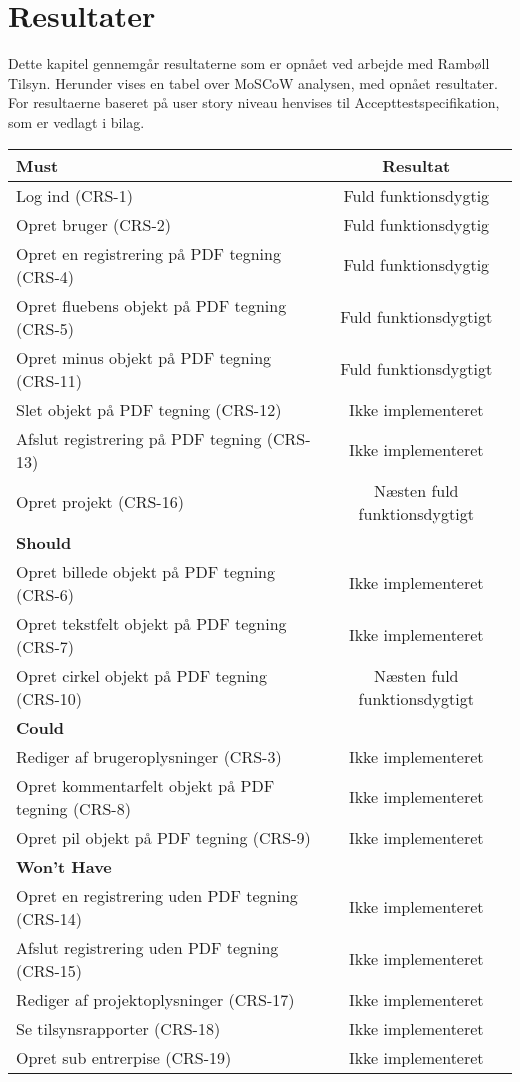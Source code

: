 \chapter{Resultater}
Dette kapitel gennemgår resultaterne som er opnået ved arbejde med Rambøll Tilsyn. Herunder vises en tabel over MoSCoW analysen, med opnået resultater.\\
For resultaerne baseret på user story niveau henvises til Accepttestspecifikation, som er vedlagt i bilag. \\
\begin{tabular}{ l | c  }
	\hline
	\textbf{Must} & \textbf{Resultat} \\ \hline
	Log ind (CRS-1) & Fuld funktionsdygtig \\
	\hline
	Opret bruger (CRS-2) & Fuld funktionsdygtig \\
	\hline
	Opret en registrering på PDF tegning (CRS-4) & Fuld funktionsdygtig\\
	\hline
	Opret fluebens objekt på PDF tegning (CRS-5) & Fuld funktionsdygtigt\\
	\hline
	Opret minus objekt på PDF tegning (CRS-11) & Fuld funktionsdygtigt\\
	\hline
	Slet objekt på PDF tegning (CRS-12) & Ikke implementeret\\
	\hline
	Afslut registrering på PDF tegning (CRS-13) & Ikke implementeret\\
	\hline
	Opret projekt (CRS-16) & Næsten fuld funktionsdygtigt\\
	\hline
	\hline
	\textbf{Should} &  \\ \hline
	Opret billede objekt på PDF tegning (CRS-6) & Ikke implementeret\\
	\hline
	Opret tekstfelt objekt på PDF tegning (CRS-7) & Ikke implementeret\\
	\hline
	Opret cirkel objekt på PDF tegning (CRS-10) & Næsten fuld funktionsdygtigt\\
	\hline
	\hline
	\textbf{Could} &  \\ \hline
	Rediger af brugeroplysninger (CRS-3) & Ikke implementeret\\
	\hline
	Opret kommentarfelt objekt på PDF tegning (CRS-8)  & Ikke implementeret\\
	\hline
	Opret pil objekt på PDF tegning (CRS-9) & Ikke implementeret\\
	\hline
	\hline
	\textbf{Won't Have} & \\ \hline
	Opret en registrering uden PDF tegning (CRS-14) & Ikke implementeret\\
	\hline
	Afslut registrering uden PDF tegning (CRS-15) & Ikke implementeret\\
	\hline
	Rediger af projektoplysninger (CRS-17) & Ikke implementeret\\
	\hline
	Se tilsynsrapporter (CRS-18) & Ikke implementeret\\
	\hline
	Opret sub entrerpise (CRS-19) & Ikke implementeret\\
	\hline
\end{tabular} \\


